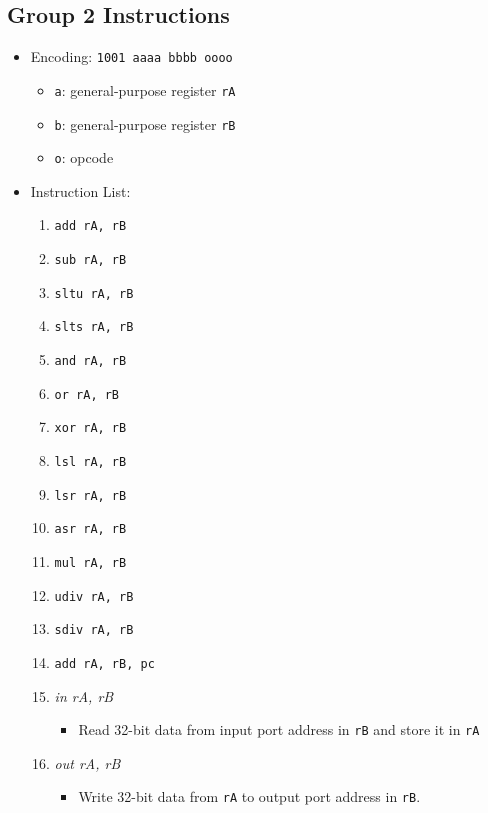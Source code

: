 \documentclass{article}
\begin{document}
	\subsection{Group 2 Instructions}
		\begin{itemize}
		\item Encoding:  \texttt{1001 aaaa bbbb oooo}
			\begin{itemize}
			\item \texttt{a}:  general-purpose register \texttt{rA}
			\item \texttt{b}:  general-purpose register \texttt{rB}
			\item \texttt{o}:  opcode
			\end{itemize}
		\item Instruction List:
			\begin{enumerate}
			\item \texttt{add rA, rB}
			\item \texttt{sub rA, rB}
			\item \texttt{sltu rA, rB}
			\item \texttt{slts rA, rB}

			\item \texttt{and rA, rB}
			\item \texttt{or rA, rB}
			\item \texttt{xor rA, rB}
			\item \texttt{lsl rA, rB}

			\item \texttt{lsr rA, rB}
			\item \texttt{asr rA, rB}
			\item \texttt{mul rA, rB}
			\item \texttt{udiv rA, rB}

			\item \texttt{sdiv rA, rB}
			\item \texttt{add rA, rB, pc}
			\item \textit{in rA, rB}
				\begin{itemize}
				\item Read 32-bit data from input port address in
					\texttt{rB} and store it in \texttt{rA}
				\end{itemize}
			\item \textit{out rA, rB}
				\begin{itemize}
				\item Write 32-bit data from \texttt{rA} to output port
					address in \texttt{rB}.
				\end{itemize}
			\end{enumerate}
		\end{itemize}
\end{document}
